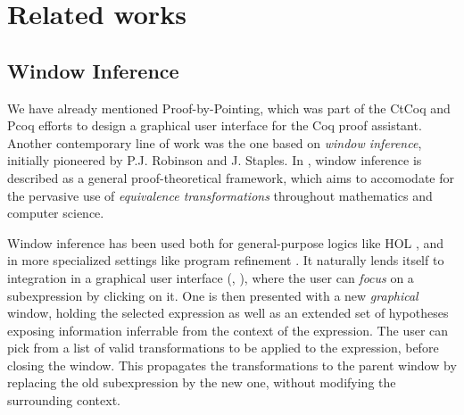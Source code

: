 \section{Related works}

\subsection*{Window Inference}

We have already mentioned Proof-by-Pointing, which was part of the CtCoq and
Pcoq efforts  to design a graphical user
interface for the Coq proof assistant. Another contemporary line of work was the
one based on \emph{window inference}, initially pioneered by P.J. Robinson and
J. Staples. In , window inference is
described as a general proof-theoretical framework, which aims to accomodate for
the pervasive use of \emph{equivalence transformations} throughout mathematics
and computer science.

Window inference has been used both for general-purpose logics like HOL
, and in more specialized settings like program
refinement . It naturally lends itself to
integration in a graphical user interface (,
), where the user can \emph{focus} on a subexpression by
clicking on it. One is then presented with a new \emph{graphical} window,
holding the selected expression as well as an extended set of hypotheses
exposing information inferrable from the context of the expression. The user can
pick from a list of valid transformations to be applied to the expression,
before closing the window. This propagates the transformations to the parent
window by replacing the old subexpression by the new one, without modifying the
surrounding context.

